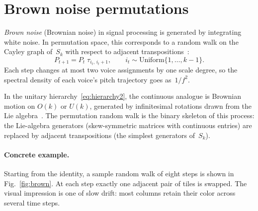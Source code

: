 \documentclass[
  twocolumn,
  aps,
  pra,
  showkeys,
  amsmath,amssymb,
  longbibliography
]{revtex4-2}
\begin{document}
\section{Brown noise permutations}
\label{sec:brown}

\emph{Brown noise} (Brownian noise) in signal processing is
generated by integrating white noise.
In permutation space, this corresponds to a random walk on the
Cayley graph of~$S_k$ with respect to adjacent
transpositions~\cite{diaconis-shahshahani-81}:
\begin{equation}
P_{t+1} = P_t\;\tau_{i_t,\,i_t+1},
\qquad
i_t\sim\mathrm{Uniform}\{1,\ldots,k{-}1\}.
\label{eq:brown}
\end{equation}
Each step changes at most two voice assignments by one scale
degree, so the spectral density of each voice's pitch
trajectory goes as~$1/f^2$.

In the unitary hierarchy~\eqref{eq:hierarchy2}, the
continuous analogue is Brownian motion on $O(k)$ or $U(k)$,
generated by infinitesimal rotations drawn from the Lie
algebra~\cite{liao-04}.
The permutation random walk is the binary skeleton of this
process: the Lie-algebra generators (skew-symmetric matrices
with continuous entries) are replaced by adjacent
transpositions (the simplest generators of~$S_k$).

\paragraph*{Concrete example.}
Starting from the identity, a sample random walk of eight
steps is shown in Fig.~\ref{fig:brown}.
At each step exactly one adjacent pair of tiles is swapped.
The visual impression is one of slow drift: most columns
retain their color across several time steps.
\end{document}
